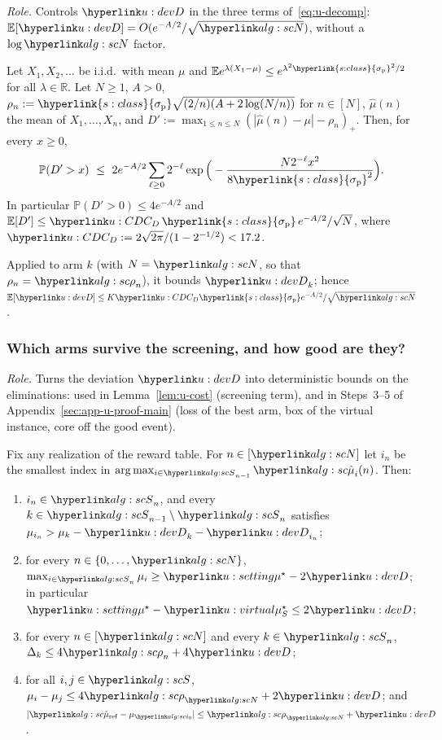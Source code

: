 \documentclass[11pt]{article}
\newcommand{\dt}[1]{\hypertarget{#1}{}}
\DeclareRobustCommand{\sy}[2]{{\hyperlink{#1}{#2}}}
\newcommand{\R}{\mathbb{R}}
\newcommand{\E}{\mathbb{E}}
\renewcommand{\P}{\mathbb{P}}
\newcommand{\1}{\mathbf{1}}
\newcommand{\sigp}{\sy{s:class}{\sigma_{\mathrm p}}}
\begin{document}
\begin{lemma}\label{lem:u-dev}\dt{u:CD}
\textit{Role.} Controls $\uD$ in the three terms of~\eqref{eq:u-decomp}: $\E[\uD]=O(e^{-A/2}/\sqrt\uN)$, without a $\log\uN$ factor.

\noindent Let $X_1,X_2,\dots$ be i.i.d.\ with mean $\mu$ and $\E e^{\lambda(X_1-\mu)}\le e^{\lambda^2\sigp^2/2}$ for all $\lambda\in\R$. Let $N\ge1$, $A>0$,
$\rho_n:=\sigp\sqrt{(2/n)(A+2\log(N/n))}$ for $n\in[N]$, $\hat\mu(n)$ the mean of $X_1,\dots,X_n$, and $D':=\max_{1\le n\le N}(|\hat\mu(n)-\mu|-\rho_n)_+$. Then,
for every $x\ge0$,
\[
\P(D'>x)\ \le\ 2e^{-A/2}\sum_{\ell\ge0}2^{-\ell}\exp\Big(-\frac{N2^{-\ell}x^2}{8\sigp^2}\Big).
\]
In particular $\P(D'>0)\le4e^{-A/2}$ and $\E[D']\le\uCD\,\sigp\,e^{-A/2}/\sqrt N$, where $\uCD:=2\sqrt{2\pi}/(1-2^{-1/2})<17.2$.
\end{lemma}

\noindent Applied to arm $k$ (with $N=\uN$, so that $\rho_n=\urho_n$), it bounds $\uD_k$; hence $\E[\uD]\le K\uCD\sigp e^{-A/2}/\sqrt\uN$.

\subsubsection*{Which arms survive the screening, and how good are they?}

\begin{lemma}[survivors]\label{lem:u-survive}
\textit{Role.} Turns the deviation $\uD$ into deterministic bounds on the eliminations: used in Lemma~\ref{lem:u-cost} (screening term), and in Steps~3--5 of
Appendix~\ref{sec:app-u-proof-main} (loss of the best arm, box of the virtual instance, core off the good event).

\noindent Fix any realization of the reward table. For $n\in[\uN]$ let $i_n$ be the smallest index in $\arg\max_{i\in\uS_{n-1}}\umuh_i(n)$. Then:
\begin{enumerate}
\item[(i)] $i_n\in\uS_n$, and every $k\in\uS_{n-1}\setminus\uS_n$ satisfies $\mu_{i_n}>\mu_k-\uD_k-\uD_{i_n}$;
\item[(ii)] for every $n\in\{0,\dots,\uN\}$, $\max_{i\in\uS_n}\mu_i\ge\umus-2\uD$; in particular $\umus-\umusS\le2\uD$;
\item[(iii)] for every $n\in[\uN]$ and every $k\in\uS_n$, $\Delta_k\le4\urho_n+4\uD$;
\item[(iv)] for all $i,j\in\uS$, $\mu_i-\mu_j\le4\urho_\uN+2\uD$; and $|\umuref-\mu_{\uio}|\le\urho_\uN+\uD$.
\end{enumerate}
\end{lemma}
\end{document}
